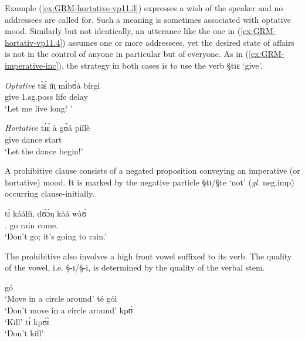 Example (\ref{ex:GRM-hortative-vp11.3}) expresses a wish of the speaker and no
addressees are called for. Such a meaning is sometimes associated with optative
mood. Similarly but not  identically,  an utterance like the one in
(\ref{ex:GRM-hortativ-vp11.4})  assumes one or more addressees, yet the desired
state of affairs is not in the control of anyone in particular but of everyone. 
 As in (\ref{ex:GRM-imperative-inc}), the  strategy in both cases is
to use the verb {\S tɪɛ} `give'.  
% 

 

\begin{exe}
 \ex\label{ex:GRM-hortative}
\begin{xlist}
 
\ex\label{ex:GRM-hortative-vp11.3}{\it Optative}
\gll tɪ́ɛ́ m̩̀ mɪ̀bʊ̀à bírgì \\
       give {\sc 1.sg.poss} life delay \\
\glt  `Let me live long! ' 

\ex\label{ex:GRM-hortativ-vp11.4}{\it Hortative}
\gll tɪ́ɛ́ à gʊ̀á píílè \\
     give {\art} dance start     \\
\glt  `Let the dance begin!'


\end{xlist}
\end{exe}


A prohibitive clause consists of  a negated proposition conveying an imperative
(or hortative) mood. It is marked by 
the negative particle {\S tɪ}/{\S te} `not'   ({\it gl.} {\sc neg.imp})
occurring
clause-initially.

\begin{exe}

\ex\label{GRM-neg-imp-vp15.10.}
\gll tɪ́ káálíì, dʊ́ɔ̀ŋ kàá wàʊ̀ \\
     {\neg.\imp} go rain {\fut} come.{\foc}   \\
\glt  `Don't go; it's going to rain.' 
\end{exe}
 
The prohibitive also involves a high front vowel   suffixed to its verb. The
quality of the vowel, i.e. {\S -ɪ}/{\S -i}, is determined by the quality of the
verbal stem.

\begin{exe}
 \ex\label{ex:GRM-neg-imperative}
\begin{xlist}
\begin{multicols}{2}
\ex gó\\
`Move in a circle around'
\ex té   góì\\
`Don't move in a circle around'
\ex  kpʊ́\\
`Kill'
\ex  tɪ́    kpʊ́ɪ̀\\
`Don't kill'
\end{multicols}
\end{xlist}
\end{exe}

